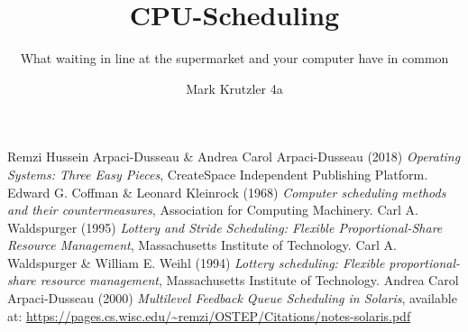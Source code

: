 \documentclass{mimosis}
\title{{CPU-Scheduling}}
\subtitle{What waiting in line at the supermarket and your computer have in common}
\author{Mark Krutzler 4a}
\begin{document}
          \frontmatter
          

          \tableofcontents

          \mainmatter


          

          

          \backmatter
          

          \begin{thebibliography}{99}
              Remzi Hussein Arpaci-Dusseau \& Andrea Carol Arpaci-Dusseau (2018) \emph{Operating Systems: Three Easy Pieces}, CreateSpace Independent Publishing Platform.
              Edward G. Coffman \& Leonard Kleinrock (1968) \emph{Computer scheduling methods and their countermeasures}, Association for Computing Machinery.
              Carl A. Waldspurger (1995) \emph{Lottery and Stride Scheduling: Flexible Proportional-Share Resource Management}, Massachusetts Institute of Technology.
              Carl A. Waldspurger \& William E. Weihl (1994) \emph{Lottery scheduling: Flexible proportional-share resource management}, Massachusetts Institute of Technology.
              Andrea Carol Arpaci-Dusseau (2000) \emph{Multilevel Feedback Queue Scheduling in Solaris}, available at: \url{https://pages.cs.wisc.edu/~remzi/OSTEP/Citations/notes-solaris.pdf}
          \end{thebibliography}
\end{document}
